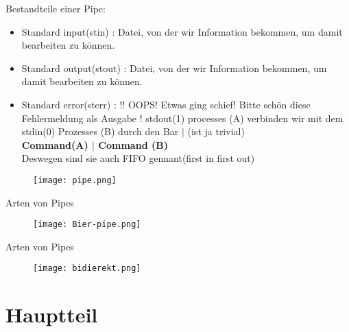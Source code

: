\documentclass[t]{beamer}       %
\begin{document}
\begin{frame}{Bestandteile einer Pipe:}
 
\begin{itemize}
\item Standard input(stin) :
Datei, von  der wir Information bekommen, um damit bearbeiten zu können.

\item Standard output(stout) :
Datei, von  der wir Information bekommen, um damit bearbeiten zu können.

\item Standard error(sterr)  :
!! OOPS! Etwas ging schief! Bitte schön diese Fehlermeldung als Ausgabe !
stdout(1) processes (A) verbinden wir mit dem stdin(0) Prozesses (B)
durch den Bar $|$     (ist ja trivial)\\
\textbf{Command(A) $|$ Command (B)}\\

Deswegen sind sie auch  FIFO gennant(first in first out) 
\end{itemize}
\end{frame}

\begin{frame}
\begin{figure}
\texttt{[image: pipe.png]}
\end{figure}
\end{frame}




\begin{frame}{Arten von Pipes}
\begin{figure}
\texttt{[image: Bier-pipe.png]}
\end{figure}
\end{frame}



\begin{frame}{Arten von Pipes}
\begin{figure}
\texttt{[image: bidierekt.png]}
\end{figure}
\end{frame}





\section{Hauptteil}
\end{document}
